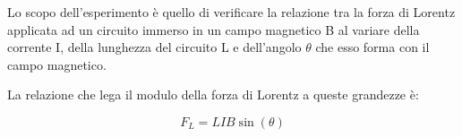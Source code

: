 {\fontsize{12}{14}\selectfont 

Lo scopo dell'esperimento è quello di verificare la relazione tra la forza di Lorentz applicata ad un circuito immerso in un campo magnetico B al variare della corrente I, della lunghezza del circuito L e dell'angolo $\theta$ che esso forma con il campo magnetico.

\par

La relazione che lega il modulo della forza di Lorentz a queste grandezze è:

\begin{equation}\label{eq:FL}
  F_L = LIB\sin(\theta)
\end{equation}

\par}
